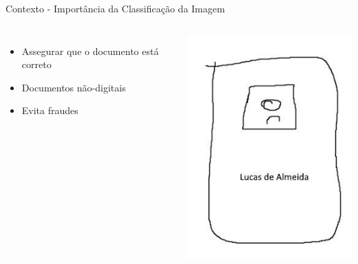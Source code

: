 \begin{frame}{Contexto - Importância da Classificação da Imagem}
\begin{columns}
\begin{itemize}
    \item Assegurar que o documento está correto
    \item Documentos não-digitais
    \item Evita fraudes
\end{itemize}

\pause
\begin{center}
    \includegraphics[width=.6\textwidth]{images-apresentacao/EXEMPLO_FRAUDE_CIN.jpg}
\end{center}
\end{columns}
\end{frame}



